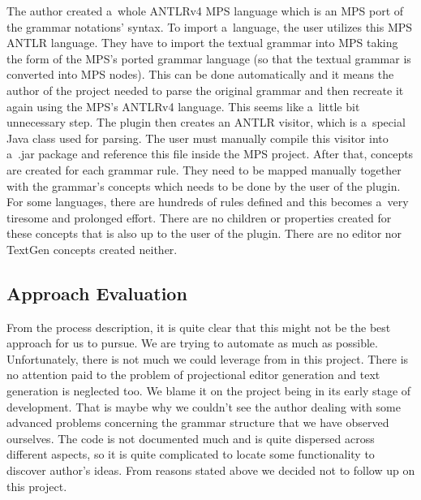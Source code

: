 The author created a~whole ANTLRv4 MPS language which is an MPS port of the grammar notations' syntax.
To import a~language, the user utilizes this MPS ANTLR language.
They have to import the textual grammar into MPS taking the form of the MPS's ported grammar language (so that the textual grammar is converted into MPS nodes).
This can be done automatically and it means the author of the project needed to parse the original grammar and then recreate it again using the MPS's ANTLRv4 language.
This seems like a~little bit unnecessary step.
The plugin then creates an ANTLR visitor, which is a~special Java class used for parsing.
The user must manually compile this visitor into a~.jar package and reference this file inside the MPS project.
After that, concepts are created for each grammar rule.
They need to be mapped manually together with the grammar's concepts which needs to be done by the user of the plugin.
For some languages, there are hundreds of rules defined and this becomes a~very tiresome and prolonged effort.
There are no children or properties created for these concepts that is also up to the user of the plugin.
There are no editor nor TextGen concepts created neither.

\subsection{Approach Evaluation}
From the process description, it is quite clear that this might not be the best approach for us to pursue.
We are trying to automate as much as possible.
Unfortunately, there is not much we could leverage from in this project.
There is no attention paid to the problem of projectional editor generation and text generation is neglected too.
We blame it on the project being in its early stage of development.
That is maybe why we couldn't see the author dealing with some advanced problems concerning the grammar structure that we have observed ourselves.
The code is not documented much and is quite dispersed across different aspects, so it is quite complicated to locate some functionality to discover author's ideas.
From reasons stated above we decided not to follow up on this project.

